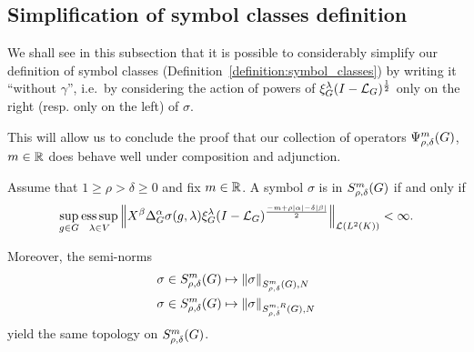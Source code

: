 \subsection{Simplification of symbol classes definition}

We shall see in this subsection that it is possible to considerably simplify our definition of symbol classes (Definition~\ref{definition:symbol_classes})
by writing it ``without $\gamma$'',
i.e.\ by considering the action of powers of $\xi^{\lambda}_{G} (I - {\mathcal{L}_{G}})^\frac{1}{2}$
only on the right (resp. only on the left) of $\sigma$.

This will allow us to conclude the proof that our collection of operators $\Psi^{m}_{\rho, \delta}(G)$, $m \in \mathbb{R}$ does behave well under composition and adjunction.

\begin{theorem}
    Assume that $1 \geq \rho > \delta \geq 0$ and fix $m \in \mathbb{R}$.
    A symbol $\sigma$ is in $S^{m}_{\rho, \delta}(G)$ if and only if
    \begin{align*}
        \sup_{g \in \Group} \esssup_{\lambda \in \VectorSpace}
        \norm [\Lin {\Lebesgue 2 \CompactGroup}] {%
            \LeftDifferentialOperator \beta
            \DifferenceOperatorOrder \alpha
            \sigma(g, \lambda)
            \Rep \lambda \BesselPotential {-m + \rho \abs \alpha - \delta \abs \beta}
        } < \infty.
    \end{align*}

    Moreover,
    the semi-norms
    \begin{align*}
        &\sigma \in S^{m}_{\rho, \delta}(G) \mapsto {\left\| \sigma \right\|}_{S^{m}_{\rho, \delta}(G), N}\\
        &\sigma \in S^{m}_{\rho, \delta}(G) \mapsto {\left\| \sigma \right\|}_{S^{m, R}_{\rho, \delta}(G), N}
    \end{align*}
    yield the same topology on $S^{m}_{\rho, \delta}(G)$.
\end{theorem}
